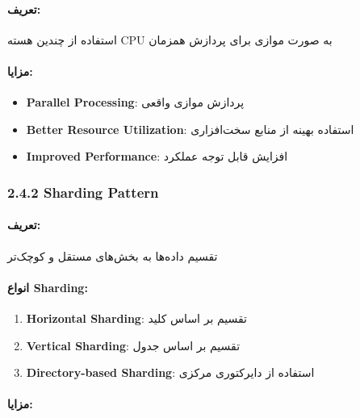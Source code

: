\documentclass[
]{article}
\providecommand{\tightlist}{%
  \setlength{\itemsep}{0pt}\setlength{\parskip}{0pt}}
\begin{document}
\paragraph{تعریف:}\label{ux62aux639ux631ux6ccux641}

استفاده از چندین هسته CPU به صورت موازی برای پردازش همزمان

\paragraph{مزایا:}\label{ux645ux632ux627ux6ccux627-1}

\begin{itemize}
\tightlist
\item
  \textbf{Parallel Processing}: پردازش موازی واقعی
\item
  \textbf{Better Resource Utilization}: استفاده بهینه از منابع سخت‌افزاری
\item
  \textbf{Improved Performance}: افزایش قابل توجه عملکرد
\end{itemize}

\subsubsection{2.4.2 Sharding Pattern}\label{sharding-pattern}

\paragraph{تعریف:}\label{ux62aux639ux631ux6ccux641-1}

تقسیم داده‌ها به بخش‌های مستقل و کوچک‌تر

\paragraph{انواع Sharding:}\label{ux627ux646ux648ux627ux639-sharding}

\begin{enumerate}
\def\labelenumi{\arabic{enumi}.}
\tightlist
\item
  \textbf{Horizontal Sharding}: تقسیم بر اساس کلید
\item
  \textbf{Vertical Sharding}: تقسیم بر اساس جدول
\item
  \textbf{Directory-based Sharding}: استفاده از دایرکتوری مرکزی
\end{enumerate}

\paragraph{مزایا:}\label{ux645ux632ux627ux6ccux627-2}
\end{document}
